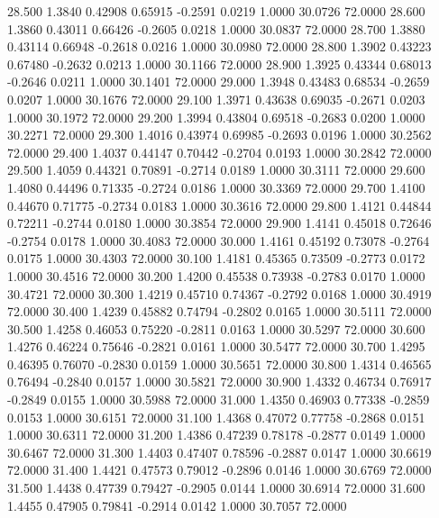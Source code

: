   28.500   1.3840   0.42908   0.65915  -0.2591   0.0219   1.0000  30.0726  72.0000
  28.600   1.3860   0.43011   0.66426  -0.2605   0.0218   1.0000  30.0837  72.0000
  28.700   1.3880   0.43114   0.66948  -0.2618   0.0216   1.0000  30.0980  72.0000
  28.800   1.3902   0.43223   0.67480  -0.2632   0.0213   1.0000  30.1166  72.0000
  28.900   1.3925   0.43344   0.68013  -0.2646   0.0211   1.0000  30.1401  72.0000
  29.000   1.3948   0.43483   0.68534  -0.2659   0.0207   1.0000  30.1676  72.0000
  29.100   1.3971   0.43638   0.69035  -0.2671   0.0203   1.0000  30.1972  72.0000
  29.200   1.3994   0.43804   0.69518  -0.2683   0.0200   1.0000  30.2271  72.0000
  29.300   1.4016   0.43974   0.69985  -0.2693   0.0196   1.0000  30.2562  72.0000
  29.400   1.4037   0.44147   0.70442  -0.2704   0.0193   1.0000  30.2842  72.0000
  29.500   1.4059   0.44321   0.70891  -0.2714   0.0189   1.0000  30.3111  72.0000
  29.600   1.4080   0.44496   0.71335  -0.2724   0.0186   1.0000  30.3369  72.0000
  29.700   1.4100   0.44670   0.71775  -0.2734   0.0183   1.0000  30.3616  72.0000
  29.800   1.4121   0.44844   0.72211  -0.2744   0.0180   1.0000  30.3854  72.0000
  29.900   1.4141   0.45018   0.72646  -0.2754   0.0178   1.0000  30.4083  72.0000
  30.000   1.4161   0.45192   0.73078  -0.2764   0.0175   1.0000  30.4303  72.0000
  30.100   1.4181   0.45365   0.73509  -0.2773   0.0172   1.0000  30.4516  72.0000
  30.200   1.4200   0.45538   0.73938  -0.2783   0.0170   1.0000  30.4721  72.0000
  30.300   1.4219   0.45710   0.74367  -0.2792   0.0168   1.0000  30.4919  72.0000
  30.400   1.4239   0.45882   0.74794  -0.2802   0.0165   1.0000  30.5111  72.0000
  30.500   1.4258   0.46053   0.75220  -0.2811   0.0163   1.0000  30.5297  72.0000
  30.600   1.4276   0.46224   0.75646  -0.2821   0.0161   1.0000  30.5477  72.0000
  30.700   1.4295   0.46395   0.76070  -0.2830   0.0159   1.0000  30.5651  72.0000
  30.800   1.4314   0.46565   0.76494  -0.2840   0.0157   1.0000  30.5821  72.0000
  30.900   1.4332   0.46734   0.76917  -0.2849   0.0155   1.0000  30.5988  72.0000
  31.000   1.4350   0.46903   0.77338  -0.2859   0.0153   1.0000  30.6151  72.0000
  31.100   1.4368   0.47072   0.77758  -0.2868   0.0151   1.0000  30.6311  72.0000
  31.200   1.4386   0.47239   0.78178  -0.2877   0.0149   1.0000  30.6467  72.0000
  31.300   1.4403   0.47407   0.78596  -0.2887   0.0147   1.0000  30.6619  72.0000
  31.400   1.4421   0.47573   0.79012  -0.2896   0.0146   1.0000  30.6769  72.0000
  31.500   1.4438   0.47739   0.79427  -0.2905   0.0144   1.0000  30.6914  72.0000
  31.600   1.4455   0.47905   0.79841  -0.2914   0.0142   1.0000  30.7057  72.0000
